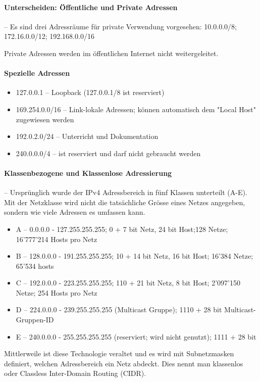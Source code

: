 \documentclass[a4paper,12pt]{article}
\begin{document}
\paragraph{Unterscheiden: Öffentliche und Private Adressen} -- Es sind drei Adressräume für private Verwendung vorgesehen: 10.0.0.0/8; 172.16.0.0/12; 192.168.0.0/16

Private Adressen werden im öffentlichen Internet nicht weitergeleitet.

\paragraph{Spezielle Adressen}
\begin{itemize}
\item 127.0.0.1 -- Loopback (127.0.0.1/8 ist reserviert)
\item 169.254.0.0/16 -- Link-lokale Adressen; können automatisch dem "Local Host" zugewiesen werden
\item 192.0.2.0/24 -- Unterricht und Dokumentation
\item 240.0.0.0/4 -- ist reserviert und darf nicht gebraucht werden
\end{itemize}
	
	
\paragraph{Klassenbezogene und Klassenlose Adressierung} -- Ursprünglich wurde der IPv4 Adressbereich in fünf Klassen unterteilt (A-E). Mit der Netzklasse wird nicht die tatsächliche Grösse eines Netzes angegeben, sondern wie viele Adressen es umfassen kann.
\begin{itemize}
\item A -- 0.0.0.0 - 127.255.255.255; 0 + 7 bit Netz, 24 bit Host;128 Netze; 16'777'214 Hosts pro Netz
\item B -- 128.0.0.0 - 191.255.255.255; 10 + 14 bit Netz, 16 bit Host; 16'384 Netze; 65'534 hosts
\item C -- 192.0.0.0 - 223.255.255.255; 110 + 21 bit Netz, 8 bit Host; 2'097'150 Netze; 254 Hosts pro Netz
\item D -- 224.0.0.0 - 239.255.255.255 (Multicast Gruppe); 1110 + 28 bit Multicast-Gruppen-ID
\item E -- 240.0.0.0 - 255.255.255.255 (reserviert; wird nicht genutzt); 1111 + 28 bit
\end{itemize}

Mittlerweile ist diese Technologie veraltet und es wird mit Subnetzmasken definiert, welchen Adressbereich ein Netz abdeckt. Dies nennt man klassenlos oder Classless Inter-Domain Routing (CIDR).
\end{document}
